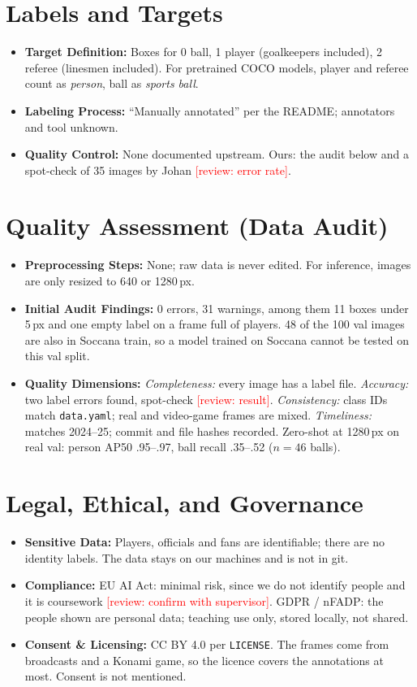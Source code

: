 \documentclass[11pt, a4paper]{article}
\newcommand{\review}[1]{\textcolor{red}{[review: #1]}}
\begin{document}
\section{Labels and Targets}
\begin{itemize}
    \item \textbf{Target Definition:} Boxes for 0 ball, 1 player (goalkeepers included), 2 referee (linesmen included). For pretrained COCO models, player and referee count as \emph{person}, ball as \emph{sports ball}.
    \item \textbf{Labeling Process:} ``Manually annotated'' per the README; annotators and tool unknown.
    \item \textbf{Quality Control:} None documented upstream. Ours: the audit below and a spot-check of 35 images by Johan \review{error rate}.
\end{itemize}

\section{Quality Assessment (Data Audit)}
\begin{itemize}
    \item \textbf{Preprocessing Steps:} None; raw data is never edited. For inference, images are only resized to 640 or 1280\,px.
    \item \textbf{Initial Audit Findings:} 0 errors, 31 warnings, among them 11 boxes under 5\,px and one empty label on a frame full of players. 48 of the 100 val images are also in Soccana train, so a model trained on Soccana cannot be tested on this val split.
    \item \textbf{Quality Dimensions:} \emph{Completeness:} every image has a label file. \emph{Accuracy:} two label errors found, spot-check \review{result}. \emph{Consistency:} class IDs match \texttt{data.yaml}; real and video-game frames are mixed. \emph{Timeliness:} matches 2024--25; commit and file hashes recorded. Zero-shot at 1280\,px on real val: person AP50 .95--.97, ball recall .35--.52 ($n=46$ balls).
\end{itemize}

\section{Legal, Ethical, and Governance}
\begin{itemize}
    \item \textbf{Sensitive Data:} Players, officials and fans are identifiable; there are no identity labels. The data stays on our machines and is not in git.
    \item \textbf{Compliance:} EU AI Act: minimal risk, since we do not identify people and it is coursework \review{confirm with supervisor}. GDPR / nFADP: the people shown are personal data; teaching use only, stored locally, not shared.
    \item \textbf{Consent \& Licensing:} CC BY 4.0 per \texttt{LICENSE}. The frames come from broadcasts and a Konami game, so the licence covers the annotations at most. Consent is not mentioned.
\end{itemize}
\end{document}
